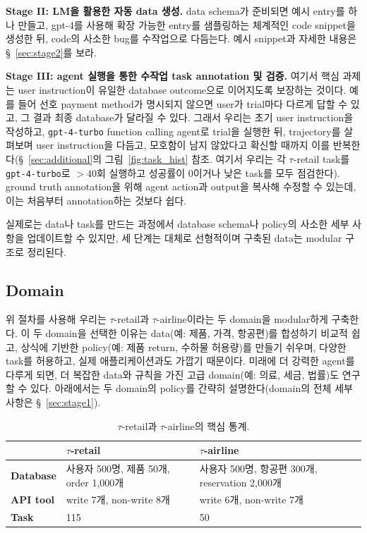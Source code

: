 \documentclass{article}
\newcommand{\retail}{$\tau$-retail}  %
\newcommand{\airline}{$\tau$-airline}
\begin{document}
\textbf{Stage II: LM을 활용한 자동 data 생성.} data schema가 준비되면 예시 entry를 하나 만들고, gpt-4를 사용해 확장 가능한 entry를 샘플링하는 체계적인 code snippet을 생성한 뒤, code의 사소한 bug를 수작업으로 다듬는다. 예시 snippet과 자세한 내용은 \S~\ref{sec:stage2}를 보라.

\textbf{Stage III: agent 실행을 통한 수작업 task annotation 및 검증.}
여기서 핵심 과제는 user instruction이 유일한 database outcome으로 이어지도록 보장하는 것이다. 예를 들어 선호 payment method가 명시되지 않으면 user가 trial마다 다르게 답할 수 있고, 그 결과 최종 database가 달라질 수 있다. 그래서 우리는 초기 user instruction을 작성하고, \texttt{gpt-4-turbo} function calling agent로 trial을 실행한 뒤, trajectory를 살펴보며 user instruction을 다듬고, 모호함이 남지 않았다고 확신할 때까지 이를 반복한다(\S~\ref{sec:additional}의 그림~\ref{fig:task_hist} 참조. 여기서 우리는 각 \retail{} task를 \texttt{gpt-4-turbo}로 $>40$회 실행하고 성공률이 0이거나 낮은 task를 모두 점검한다). ground truth annotation을 위해 agent action과 output을 복사해 수정할 수 있는데, 이는 처음부터 annotation하는 것보다 쉽다.



실제로는 data나 task를 만드는 과정에서 database schema나 policy의 사소한 세부 사항을 업데이트할 수 있지만, 세 단계는 대체로 선형적이며 구축된 data는 modular 구조로 정리된다.

\subsection{Domain}
위 절차를 사용해 우리는 \retail{}과 \airline{}이라는 두 domain을 modular하게 구축한다.
이 두 domain을 선택한 이유는 data(예: 제품, 가격, 항공편)를 합성하기 비교적 쉽고, 상식에 기반한 policy(예: 제품 return, 수하물 허용량)를 만들기 쉬우며, 다양한 task를 허용하고, 실제 애플리케이션과도 가깝기 때문이다. 미래에 더 강력한 agent를 다루게 되면, 더 복잡한 data와 규칙을 가진 고급 domain(예: 의료, 세금, 법률)도 연구할 수 있다. 아래에서는 두 domain의 policy를 간략히 설명한다(domain의 전체 세부사항은 \S~\ref{sec:stage1}).
\begin{table}[t]

\centering
\begin{tabular}{lll}
\toprule
 & \textbf{\retail{}} & \textbf{\airline{}} \\
\midrule
\textbf{Database} & 사용자 500명, 제품 50개, order 1,000개 & 사용자 500명, 항공편 300개, reservation 2,000개 \\
\textbf{API tool} & write 7개, non-write 8개 & write 6개, non-write 7개 \\
\textbf{Task} & 115 & 50 \\
\bottomrule
\end{tabular}
\vspace{10pt}
\caption{\retail{}과 \airline{}의 핵심 통계.}
\label{tab:domains}
\vspace{-15pt}
\end{table}
\end{document}
